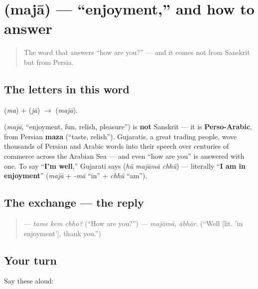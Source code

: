 \section[\gu{મજા}]{ (majā) — \textquotedblleft{}enjoyment,\textquotedblright{} and how to answer}

\label{lesson:GU-C03-majaa}



\begin{quote}
The word that answers \textquotedblleft{}how are you?\textquotedblright{} — and it comes not from Sanskrit but from Persia.
\end{quote}

\subsection*{The letters in this word}
\textbf{} (\emph{ma}) + \textbf{} (\emph{jā}) $\to$ \textbf{} (\emph{majā}).

\begin{cousinweb}
\textbf{} (\emph{majā}, \textquotedblleft{}enjoyment, fun, relish, pleasure\textquotedblright{}) is \textbf{not} Sanskrit — it is \textbf{Perso-Arabic}, from Persian \textbf{maza} (\textquotedblleft{}taste, relish\textquotedblright{}). Gujaratis, a great trading people, wove thousands of Persian and Arabic words into their speech over centuries of commerce across the Arabian Sea — and even \textquotedblleft{}how are you\textquotedblright{} is answered with one. To say \textquotedblleft{}\textbf{I'm well},\textquotedblright{} Gujarati says \textbf{  } (\emph{hũ majāmā chhũ}) — literally \textquotedblleft{}\textbf{I am in enjoyment}\textquotedblright{} (\emph{majā} + \emph{-mā} \textquotedblleft{}in\textquotedblright{} + \emph{chhũ} \textquotedblleft{}am\textquotedblright{}).
\end{cousinweb}

\subsection*{The exchange — the reply}
\begin{quote}
— \emph{tame kem chho?} (\textquotedblleft{}How are you?\textquotedblright{}) — \emph{majāmā, ābhār.} (\textquotedblleft{}Well {[}lit. 'in enjoyment'{]}, thank you.\textquotedblright{})
\end{quote}

\subsection*{Your turn}
Say these aloud:

